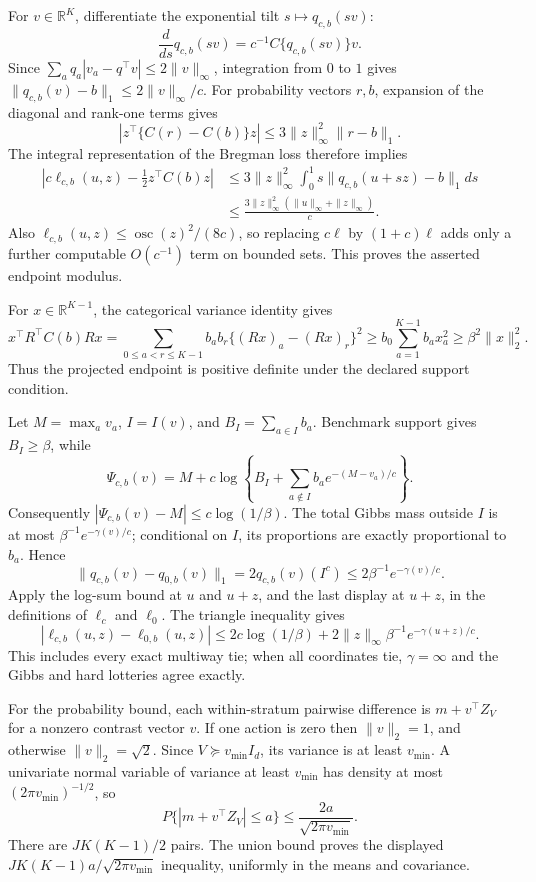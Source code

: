 For \(v\in\mathbb R^K\), differentiate the exponential tilt \(s\mapsto q_{c,b}(sv)\):
\[
 \frac{d}{ds}q_{c,b}(sv)=c^{-1}C\{q_{c,b}(sv)\}v.
\]
Since \(\sum_a q_a|v_a-q^\top v|\le2\|v\|_\infty\), integration from \(0\) to \(1\) gives \(\|q_{c,b}(v)-b\|_1\le2\|v\|_\infty/c\).  For probability vectors \(r,b\), expansion of the diagonal and rank-one terms gives
\[
 |z^\top\{C(r)-C(b)\}z|
 \le3\|z\|_\infty^2\|r-b\|_1.
\]
The integral representation of the Bregman loss therefore implies
\[
 \begin{aligned}
 \left|c\ell_{c,b}(u,z)-\tfrac12z^\top C(b)z\right|
 &\le3\|z\|_\infty^2\int_0^1s\|q_{c,b}(u+sz)-b\|_1ds\\
 &\le \frac{3\|z\|_\infty^2(\|u\|_\infty+\|z\|_\infty)}{c}.
 \end{aligned}
\]
Also \(\ell_{c,b}(u,z)\le\operatorname{osc}(z)^2/(8c)\), so replacing \(c\ell\) by \((1+c)\ell\) adds only a further computable \(O(c^{-1})\) term on bounded sets.  This proves the asserted endpoint modulus.

For \(x\in\mathbb R^{K-1}\), the categorical variance identity gives
\[
 x^\top R^\top C(b)Rx
 =\sum_{0\le a<r\le K-1}b_ab_r\{(Rx)_a-(Rx)_r\}^2
 \ge b_0\sum_{a=1}^{K-1}b_ax_a^2
 \ge\beta^2\|x\|_2^2.
\]
Thus the projected endpoint is positive definite under the declared support condition.

Let \(M=\max_av_a\), \(I=I(v)\), and \(B_I=\sum_{a\in I}b_a\).  Benchmark support gives \(B_I\ge\beta\), while
\[
 \Psi_{c,b}(v)=M+c\log\left\{B_I+\sum_{a\notin I}b_ae^{-(M-v_a)/c}\right\}.
\]
Consequently \(|\Psi_{c,b}(v)-M|\le c\log(1/\beta)\).  The total Gibbs mass outside \(I\) is at most \(\beta^{-1}e^{-\gamma(v)/c}\); conditional on \(I\), its proportions are exactly proportional to \(b_a\).  Hence
\[
 \|q_{c,b}(v)-q_{0,b}(v)\|_1
 =2q_{c,b}(v)(I^c)
 \le2\beta^{-1}e^{-\gamma(v)/c}.
\]
Apply the log-sum bound at \(u\) and \(u+z\), and the last display at \(u+z\), in the definitions of \(\ell_c\) and \(\ell_0\).  The triangle inequality gives
\[
 |\ell_{c,b}(u,z)-\ell_{0,b}(u,z)|
 \le2c\log(1/\beta)+2\|z\|_\infty\beta^{-1}e^{-\gamma(u+z)/c}.
\]
This includes every exact multiway tie; when all coordinates tie, \(\gamma=\infty\) and the Gibbs and hard lotteries agree exactly.

For the probability bound, each within-stratum pairwise difference is \(m+v^\top Z_V\) for a nonzero contrast vector \(v\).  If one action is zero then \(\|v\|_2=1\), and otherwise \(\|v\|_2=\sqrt2\).  Since \(V\succeq v_{\min}I_d\), its variance is at least \(v_{\min}\).  A univariate normal variable of variance at least \(v_{\min}\) has density at most \((2\pi v_{\min})^{-1/2}\), so
\[
 P\{|m+v^\top Z_V|\le a\}\le\frac{2a}{\sqrt{2\pi v_{\min}}}.
\]
There are \(J K(K-1)/2\) pairs.  The union bound proves the displayed \(JK(K-1)a/\sqrt{2\pi v_{\min}}\) inequality, uniformly in the means and covariance.

